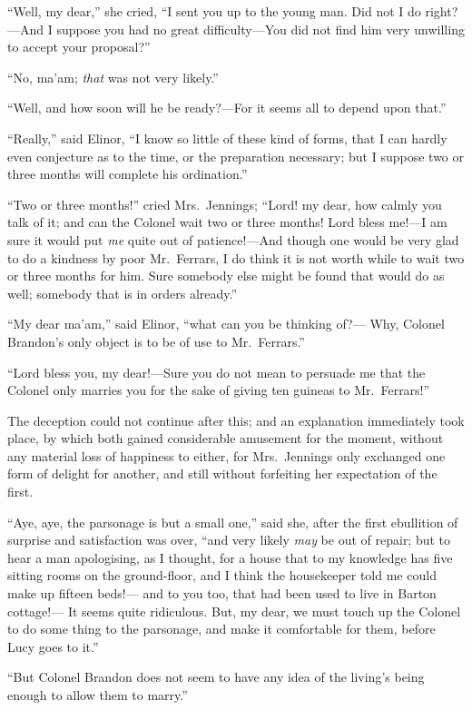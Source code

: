 ``Well, my dear,'' she cried, ``I sent you up to the
young man.  Did not I do right?---And I suppose you had
no great difficulty---You did not find him very unwilling
to accept your proposal?''

``No, ma'am; \emph{that} was not very likely.''

``Well, and how soon will he be ready?---For it seems
all to depend upon that.''

``Really,'' said Elinor, ``I know so little of these kind
of forms, that I can hardly even conjecture as to the time,
or the preparation necessary; but I suppose two or three
months will complete his ordination.''

``Two or three months!'' cried Mrs.\ Jennings; ``Lord! my dear,
how calmly you talk of it; and can the Colonel wait two
or three months! Lord bless me!---I am sure it would put \emph{me}
quite out of patience!---And though one would be very glad
to do a kindness by poor Mr.\ Ferrars, I do think it is
not worth while to wait two or three months for him.
Sure somebody else might be found that would do as well;
somebody that is in orders already.''

``My dear ma'am,'' said Elinor, ``what can you be thinking of?---%
Why, Colonel Brandon's only object is to be of use to Mr.\ Ferrars.''

``Lord bless you, my dear!---Sure you do not mean to persuade
me that the Colonel only marries you for the sake of giving
ten guineas to Mr.\ Ferrars!''

The deception could not continue after this;
and an explanation immediately took place, by which both
gained considerable amusement for the moment, without any
material loss of happiness to either, for Mrs.\ Jennings
only exchanged one form of delight for another, and still
without forfeiting her expectation of the first.

``Aye, aye, the parsonage is but a small one,'' said she,
after the first ebullition of surprise and satisfaction
was over, ``and very likely \emph{may} be out of repair; but to hear
a man apologising, as I thought, for a house that to my
knowledge has five sitting rooms on the ground-floor, and I
think the housekeeper told me could make up fifteen beds!---%
and to you too, that had been used to live in Barton cottage!---%
It seems quite ridiculous.  But, my dear, we must
touch up the Colonel to do some thing to the parsonage,
and make it comfortable for them, before Lucy goes to it.''

``But Colonel Brandon does not seem to have any idea
of the living's being enough to allow them to marry.''

